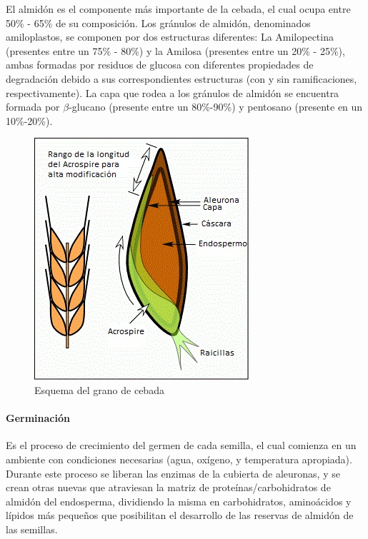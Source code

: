                 \par El almidón es el componente más importante de la cebada, el cual ocupa entre 50\% - 65\% de su composición. Los gránulos de almidón, denominados amiloplastos, se componen por dos estructuras diferentes: La Amilopectina (presentes entre un 75\% - 80\%) y la Amilosa (presentes entre un 20\% - 25\%), ambas formadas por residuos de glucosa con diferentes propiedades de degradación debido a sus correspondientes estructuras (con y sin ramificaciones, respectivamente). La capa que rodea a los gránulos de almidón se encuentra formada por $\beta$-glucano (presente entre un 80\%-90\%) y pentosano (presente en un 10\%-20\%).
        
                \begin{figure} [h]
		            \centerline{\includegraphics[scale=0.9]{estructura_de_grano.jpg}}
		            \caption{Esquema del grano de cebada}
	                \label{EstructuraGrano}
    	        \end{figure}
    	
    	        \paragraph{Germinación}
    	        Es el proceso de crecimiento del germen de cada semilla, el cual comienza en un ambiente con condiciones necesarias (agua, oxígeno, y temperatura apropiada). Durante este proceso se liberan las enzimas de la cubierta de aleuronas, y se crean otras nuevas que atraviesan la matriz de proteínas/carbohidratos de almidón del endosperma, dividiendo la misma en carbohidratos, aminoácidos y lípidos más pequeños que posibilitan el desarrollo de las reservas de almidón de las semillas.
    	
